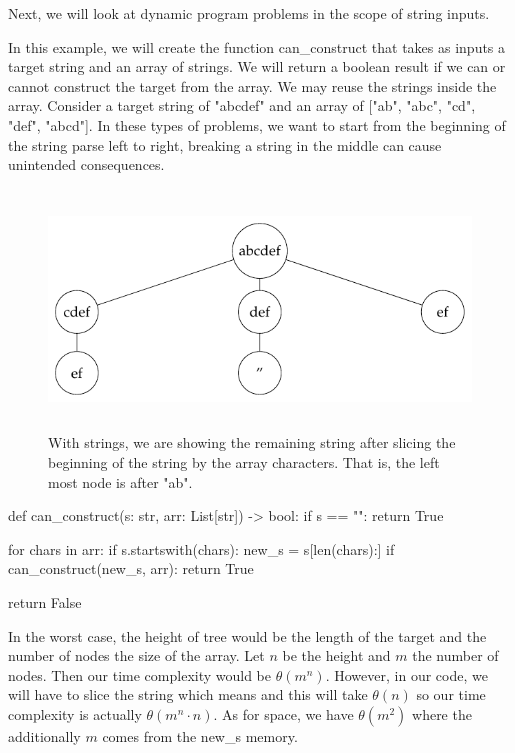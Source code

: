\documentclass[12pt,dvipsnames,svgnames,x11names]{article}
\begin{document}
Next, we will look at dynamic program problems in the scope of string inputs.
\par\medskip
In this example, we will create the function can\_construct that takes as inputs a target string and an
array of strings. We will return a boolean result if we can or cannot construct the target from the array.
We may reuse the strings inside the array. Consider a target string of "abcdef" and an array of
["ab", "abc", "cd", "def", "abcd"]. In these types of problems, we want to start from the beginning of the
string parse left to right, breaking a string in the middle can cause unintended consequences. 
\begin{figure}[h]
	\centering
	\includegraphics[height=2.5in]{can_construct_strings.pdf}
	\caption{With strings, we are showing the remaining string after slicing the beginning of the string by
	the array characters. That is, the left most node is after "ab".}
	\label{fig:can_construct_strings}
\end{figure}
\begin{python}
def can_construct(s: str, arr: List[str]) -> bool:
  if s == "":
    return True
  
  for chars in arr:
    if s.startswith(chars):
      new_s = s[len(chars):]
      if can_construct(new_s, arr):
        return True
        
  return False
\end{python}
In the worst case, the height of tree would be the length of the target and the number of nodes the size
of the array. Let \(n\) be the height and \(m\) the number of nodes. Then our time complexity would be
\(\theta(m^n)\). However, in our code, we will have to slice the string which means and this will take
\(\theta(n)\) so our time complexity is actually \(\theta(m^n\cdot n)\). As for space, we have 
\(\theta(m^2)\) where the additionally \(m\) comes from the new\_s memory.
\par\medskip
\end{document}
